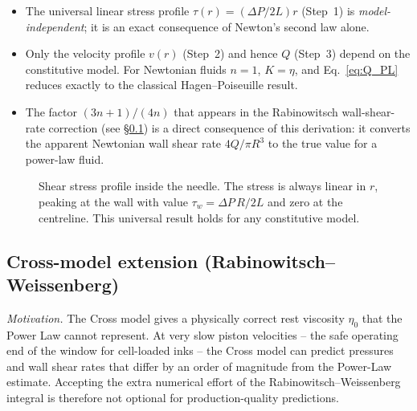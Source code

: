 \documentclass[11pt,a4paper]{article}
\begin{document}
\begin{derivationbox}[title={DERIVATION --- Power-Law pipe flow: velocity profile, $Q(\tau_w)$, and inversion to $\tau_w(Q)$}]
\begin{itemize}[leftmargin=1.6em,itemsep=2pt]
\item The universal linear stress profile $\tau(r)=(\Delta P/2L)r$
  (Step~1) is \emph{model-independent}; it is an exact consequence of
  Newton's second law alone.
\item Only the velocity profile $v(r)$ (Step~2) and hence $Q$ (Step~3)
  depend on the constitutive model. For Newtonian fluids $n=1$, $K=\eta$,
  and Eq.~\eqref{eq:Q_PL} reduces exactly to the classical Hagen--Poiseuille
  result.
\item The factor $(3n+1)/(4n)$ that appears in the Rabinowitsch wall-shear-rate
  correction (see \S\ref{sec:cross_HP}) is a direct consequence of this
  derivation: it converts the apparent Newtonian wall shear rate
  $4Q/\pi R^3$ to the true value for a power-law fluid.
\end{itemize}

\end{derivationbox}

\begin{figure}[h]
\centering
{}
\caption{Shear stress profile inside the needle. The stress is always
linear in $r$, peaking at the wall with value $\tau_w=\Delta P\,R/2L$
and zero at the centreline. This universal result holds for any
constitutive model.}
\label{fig:stress_profile}
\end{figure}

\subsection{Cross-model extension (Rabinowitsch--Weissenberg)}
\label{sec:cross_HP}

\emph{Motivation.} The Cross model gives a physically correct rest viscosity
$\eta_0$ that the Power Law cannot represent. At very slow piston velocities
-- the safe operating end of the window for cell-loaded inks -- the Cross
model can predict pressures and wall shear rates that differ by an order of
magnitude from the Power-Law estimate. Accepting the extra numerical effort
of the Rabinowitsch--Weissenberg integral is therefore not optional for
production-quality predictions.
\end{document}
